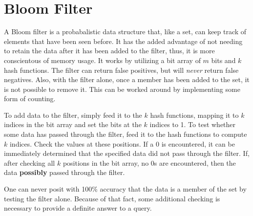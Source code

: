 \section{Bloom Filter}

A Bloom filter is a probabalistic data structure that, like a set, can keep track of elements that have been seen before.
It has the added advantage of not needing to retain the data after it has been added to the filter, thus, it is more conscientous of memory usage.
It works by utilizing a bit array of $m$ bits and $k$ hash functions.
The filter can return false positives, but will \textit{never} return false negatives.
Also, with the filter alone, once a member has been added to the set, it is not possible to remove it.
This can be worked around by implementing some form of counting.

To add data to the filter, simply feed it to the $k$ hash functions, mapping it to $k$ indices in the bit array and set the bits at the $k$ indices to 1.
To test whether some data has passed through the filter, feed it to the hash functions to compute $k$ indices.
Check the values at these positions.
If a 0 is encountered, it can be immediately determined that the specified data did not pass through the filter.
If, after checking all $k$ positions in the bit array, no 0s are encountered, then the data \textbf{possibly} passed through the filter.

One can never posit with 100\% accuracy that the data is a member of the set by testing the filter alone.
Because of that fact, some additional checking is necessary to provide a definite answer to a query.
